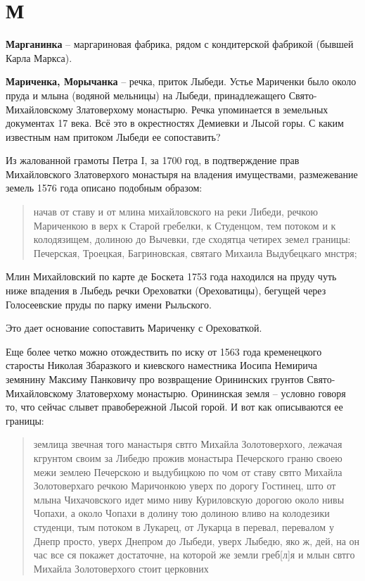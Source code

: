 \chapter*{М}

\textbf{Марганинка} – маргариновая фабрика, рядом с кондитерской фабрикой (бывшей Карла Маркса).\\

\medskip

\textbf{Мариченка, Морычанка} – речка, приток Лыбеди. Устье Мариченки было около пруда и млына (водяной мельницы) на Лыбеди, принадлежащего Свято-Михайловскому Златоверхому монастырю. Речка упоминается в земельных документах 17 века. Всё это в окрестностях Демиевки и Лысой горы. С каким известным нам притоком Лыбеди ее сопоставить?

Из жалованной грамоты Петра I, за 1700 год, в подтверждение прав Михайловского Златоверхого монастыря на владения имуществами, размежевание земель 1576 года описано подобным образом:

\begin{quotation}
начав от ставу и от млина михайловского на реки Либеди, речкою Мариченкою в верх к Старой гребелки, к Студенцом, тем потоком и к колодязищем, долиною до Вычевки, где сходятца четирех земел границы: Печерская, Троецкая, Багриновская, святаго Михаила Выдубецкаго мнстря;
\end{quotation}

Млин Михайловский по карте де Боскета 1753 года находился на пруду чуть ниже впадения в Лыбедь речки Ореховатки (Ореховатицы), бегущей через Голосеевские пруды по парку имени Рыльского.

Это дает основание сопоставить Мариченку с Ореховаткой.

Еще более четко можно отождествить по иску от 1563 года кременецкого старосты Николая Збаразкого и киевского наместника 
Иосипа Немирича земянину Максиму Панковичу про возвращение Орининских грунтов Свято-Михайловскому Златоверхому монастырю. Орининская земля – условно говоря то, что сейчас слывет правобережной Лысой горой. И вот как описываются ее границы:

\begin{quotation}
землица звечная того манастыря свтго Михайла Золотоверхого, лежачая кгрунтом своим за Либедю прожив монастыра Печерского граню своею межи землею Печерскою и выдубицкою по чом от ставу свтго Михайла Золотоверхаго речкою Маричонкою уверх по дорогу Гостинец, што от млына Чихачовского идет мимо ниву Куриловскую дорогою около нивы Чопахи, а около Чопахи в долину тою долиною вливо на колодезики студенци, тым потоком в Лукарец, от Лукарца в перевал, перевалом у Днепр просто, уверх Днепром до Лыбеди, уверх Лыбедю, яко ж, дей, на он час все ся покажет достаточне, на которой же земли греб[л]я и млын свтго Михайла Золотоверхого стоит церковних
\end{quotation}

